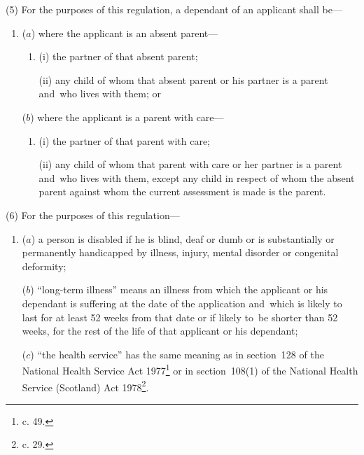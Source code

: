 \documentclass[12pt,a4paper]{article}
\begin{document}
(5) For the purposes of this regulation, a dependant of an applicant shall be—
\begin{enumerate}\item[]
($a$) where the applicant is an absent parent—
\begin{enumerate}\item[]
(i) the partner of that absent parent;

(ii) any child of whom that absent parent or his partner is a parent and~who
lives with them; or
\end{enumerate}

($b$) where the applicant is a parent with care—
\begin{enumerate}\item[]
(i) the partner of that parent with care;

(ii) any child of whom that parent with care or her partner is a parent and~who
lives with them, except any child in respect of whom the absent parent against
whom the current assessment is made is the parent.
\end{enumerate}
\end{enumerate}

(6) For the purposes of this regulation—
\begin{enumerate}\item[]
($a$) a person is disabled if he is blind, deaf or dumb or is substantially or
permanently handicapped by illness, injury, mental disorder or congenital
deformity;

($b$) “long-term illness” means an illness from which the applicant or his
dependant is suffering at the date of the application and~which is likely to
last for at least 52 weeks from that date or if likely to~be shorter than 52
weeks, for the rest of the life of that applicant or his dependant;

($c$) “the health service” has the same meaning as in section~128 of the National
Health Service Act 1977\footnote{ c. 49.} or in section~108(1) of the National Health Service
(Scotland) Act 1978\footnote{ c. 29.}.
\end{enumerate}

\end{document}
